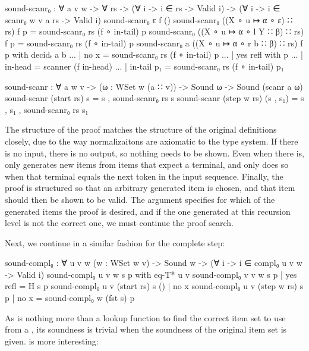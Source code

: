 		\begin{code}

			sound-scanr₀ : ∀ {a v w} -> ∀ rs ->
			  (∀ {i} -> i ∈ rs -> Valid i) ->
			  (∀ {i} -> i ∈ scanr₀ {w} {v} a rs -> Valid i)
			sound-scanr₀ ε f ()
			sound-scanr₀ ((X ∘ u ↦ α ∘ ε) ∷ rs) f p = sound-scanr₀ rs (f ∘ in-tail) p
			sound-scanr₀ ((X ∘ u ↦ α ∘ l Y ∷ β) ∷ rs) f p = sound-scanr₀ rs (f ∘ in-tail) p
			sound-scanr₀ {a} ((X ∘ u ↦ α ∘ r b ∷ β) ∷ rs) f p with decidₜ a b
			... | no x = sound-scanr₀ rs (f ∘ in-tail) p
			... | yes refl with p
			...            | in-head    = scanner (f in-head)
			...            | in-tail p₁ = sound-scanr₀ rs (f ∘ in-tail) p₁

			sound-scanr : ∀ {a w v} -> (ω : WSet w (a ∷ v)) ->
			  Sound ω -> Sound (scanr a ω)
			sound-scanr (start rs) s = s , sound-scanr₀ rs s
			sound-scanr (step w rs) (s , s₁) = s , s₁ , sound-scanr₀ rs s₁

		\end{code}

		The structure of the proof matches the structure of the original 
		definitions closely, due to the way normalizaitons are axiomatic to the
		type system. If there is no input, there is no output, so nothing 
		needs to be shown. Even when there is,  only generates
		new items from items that expect a terminal, and only does so when that 
		terminal equals the next token in the input sequence. Finally, the 
		proof is structured so that an arbitrary generated item is chosen, and 
		that item should then be shown to be valid. The argument  
		specifies for which of the generated items the proof is desired, and if 
		the one generated at this recursion level is not the correct one, we 
		must continue the proof search.

		Next, we continue in a similar fashion for the complete step:

		\begin{code}

			sound-compl₀ : ∀ {u v w} (w : WSet w v) ->
			  Sound w -> (∀ {i} -> i ∈ compl₀ {u} {v} w -> Valid i)
			sound-compl₀ {u} {v} w s p           with eq-T* u v
			sound-compl₀ {v} {v} w s p           | yes refl = H s p
			sound-compl₀ {u} {v} (start rs) s () | no x
			sound-compl₀ {u} {v} (step w rs) s p | no x = sound-compl₀ w (fst s) p
		
		\end{code}

		As  is nothing more than a lookup function to find
		the correct item set to use from a , its soundness is 
		trivial when the soundness of the original item set is given. 
		 is more interesting:

